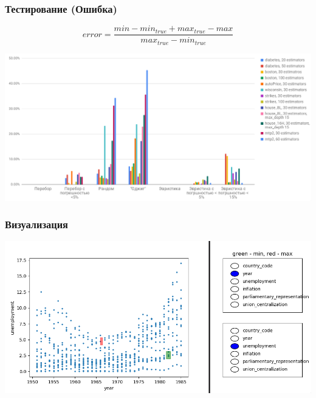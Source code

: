 \documentclass{beamer}
\begin{document}
\begin{frame}
    \frametitle{Тестирование (Ошибка)}
    \[
        error = \frac{min - min_{true} + max_{true} - max}{max_{true} - min_{true}}
    \]
    \begin{center}
    \includegraphics[width=\textwidth]{graph_error.png}
    \end{center}
\end{frame}

\begin{frame}
\frametitle{Визуализация}
    \includegraphics[width=\textwidth]{visual.png}
\end{frame}
\end{document}
